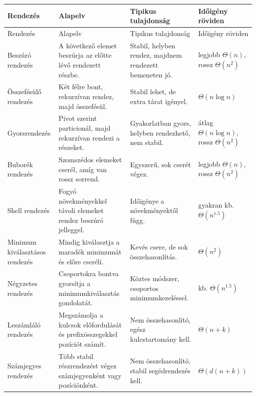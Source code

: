 \begingroup
\setlength{\tabcolsep}{4pt}
\begin{longtable}{L{0.20\textwidth}L{0.34\textwidth}L{0.23\textwidth}L{0.13\textwidth}}
\toprule
Rendezés & Alapelv & Tipikus tulajdonság & Időigény röviden \\
\midrule
\endfirsthead
\toprule
Rendezés & Alapelv & Tipikus tulajdonság & Időigény röviden \\
\midrule
\endhead
Beszúró rendezés & A következő elemet beszúrja az előtte lévő rendezett részbe. & Stabil, helyben rendez, majdnem rendezett bemeneten jó. & legjobb $\Theta(n)$, rossz $\Theta(n^2)$ \\
Összefésülő rendezés & Két félre bont, rekurzívan rendez, majd összefésül. & Stabil lehet, de extra tárat igényel. & $\Theta(n\log n)$ \\
Gyorsrendezés & Pivot szerint particionál, majd rekurzívan rendezi a részeket. & Gyakorlatban gyors, helyben rendezhető, nem stabil. & átlag $\Theta(n\log n)$, rossz $\Theta(n^2)$ \\
Buborék rendezés & Szomszédos elemeket cserél, amíg van rossz sorrend. & Egyszerű, sok cserét végez. & legjobb $\Theta(n)$, rossz $\Theta(n^2)$ \\
Shell rendezés & Fogyó növekményekkel távoli elemeket rendez beszúró jelleggel. & Időigénye a növekményektől függ. & gyakran kb. $\Theta(n^{1.5})$ \\
Minimum kiválasztásos rendezés & Mindig kiválasztja a maradék minimumát és előre cseréli. & Kevés csere, de sok összehasonlítás. & $\Theta(n^2)$ \\
Négyzetes rendezés & Csoportokra bontva gyorsítja a minimumkiválasztás gondolatát. & Köztes módszer, csoportos minimumkezeléssel. & kb. $\Theta(n^{1.5})$ \\
Leszámláló rendezés & Megszámolja a kulcsok előfordulását és prefixösszegekkel pozíciót számít. & Nem összehasonlító, egész kulcstartomány kell. & $\Theta(n+k)$ \\
Számjegyes rendezés & Több stabil részrendezést végez számjegyenként vagy pozíciónként. & Nem összehasonlító, stabil segédrendezés kell. & $\Theta(d(n+k))$ \\
\bottomrule
\end{longtable}
\endgroup
